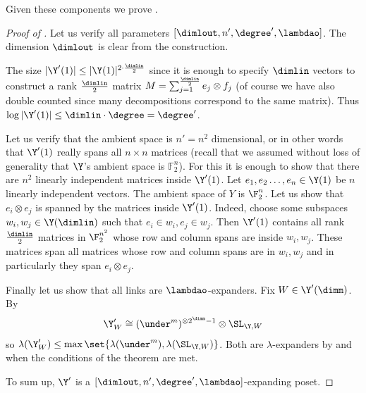 
Given these components we prove .
\begin{proof}[Proof of ]
    Let us verify all parameters \([\dimlout,n',\degree', \lambdao]\). The dimension \(\dimlout\) is clear from the construction. 
    
    The size \(|\Y'(1)| \leq |\Y(1)|^{2 \cdot \frac{\dimlin}{2}}\) since it is enough to specify \(\dimlin\) vectors to construct a rank \(\frac{\dimlin}{2}\) matrix \(M = \sum_{j=1}^{\frac{\dimlin}{2}} e_j \otimes f_j\) (of course we have also double counted since many decompositions correspond to the same matrix). Thus \(\log |\Y'(1)| \leq \dimlin \cdot \degree =\degree'\).

    Let us verify that the ambient space is \(n'=n^2\) dimensional, or in other words that \(\Y'(1)\) really spans all \(n \times n\) matrices (recall that we assumed without loss of generality that \(\Y\)'s ambient space is \(\mathbb{F}_2^n\)). For this it is enough to show that there are \(n^2\) linearly independent matrices inside \(\Y'(1)\). Let \(e_1,e_2\dots,e_n \in \Y(1)\) be \(n\) linearly independent vectors. The ambient space of \(Y\) is \(\F_2^n\). Let us show that \(e_i \otimes e_j\) is spanned by the matrices inside \(\Y'(1)\). Indeed, choose some subspaces \(w_i,w_j \in \Y(\dimlin)\) such that \(e_i \in w_i, e_j \in w_j\). Then $\Y'(1)$ contains all rank \(\frac{\dimlin}{2}\) matrices in $\F_2^{n^2}$ whose row and column spans are inside \(w_i,w_j\). These matrices span all matrices whose row and column spans are in \(w_i,w_j\) and in particularly they span \(e_i \otimes e_j\). 
       
    Finally let us show that all links are \(\lambdao\)-expanders. Fix \(W \in \Y' (\dimm)\). By 
    \[\Y'_W \cong (\under^m)^{\otimes 2^{\dimm}-1} \otimes \SL_{\Y,W}\]
    so \(\lambda(\Y'_W) \leq \max \set{\lambda(\under^m), \lambda(\SL_{\Y,W})}\).
    Both are \(\lambda\)-expanders by  and  when the conditions of the theorem are met.

    To sum up, \(\Y'\) is a \([\dimlout,n',\degree', \lambdao]\)-expanding poset.
\end{proof}
